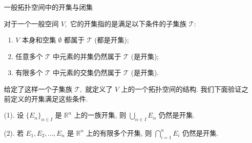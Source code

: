 
\begin{frame}{一般拓扑空间中的开集与闭集}

对于一个一般空间 $V,$ 它的开集指的是满足以下条件的子集族 $\mathscr{T}:$
\begin{enumerate}
\item $V$ 本身和空集 $\emptyset$ 都属于 $\mathscr{T}$ (都是开集);
\item 任意多个 $\mathscr{T}$ 中元素的并集仍然属于 $\mathscr{T}$ (是开集);
\item 有限多个 $\mathscr{T}$ 中元素的交集仍然属于 $\mathscr{T}$ (是开集).
\end{enumerate}
给定了这样一个子集族 $\mathscr{T},$ 就定义了 $V$ 上的一个拓扑空间的结构.
\pause
我们下面验证之前定义的开集满足这些条件.

\vspace{1em}

\begin{thm}
(1). 设 $\{ E_{\alpha} \}_{\alpha \in I}$ 是 $\mathbb{R}^n$ 上的一族开集, 则 $\bigcup\limits_{\alpha \in I} E_{\alpha}$ 仍然是开集. \par
(2). 若 $E_1, E_2, \dots, E_n$ 是 $\mathbb{R}^n$ 上的有限多个开集, 则 $\bigcap\limits_{i=1}^n E_i$ 仍然是开集.
\end{thm}

\end{frame}


